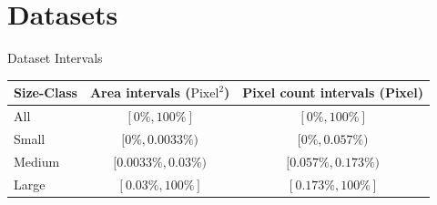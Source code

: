 \documentclass[18pt]{beamer}
\begin{document}
\section{Datasets}
\begin{frame}{Dataset Intervals}

    \begin{table}[H]
        \centering
        \begin{tabular}{l c c}
            \hline
            Size-Class      & Area intervals ($\text{Pixel}^2$)     & Pixel count intervals (Pixel)     \\
            \hline
            All & $[0\%, 100\%]$ & $[0\%, 100\%]$ \\
            Small & $[0\%, 0.0033\%)$ & $[0\%, 0.057\%)$ \\
            Medium & $[0.0033\%, 0.03\%)$ & $[0.057\%, 0.173\%)$ \\
            Large & $[0.03\%, 100\%]$ & $[0.173\%, 100\%]$ \\
            \hline
        \end{tabular}
    \end{table}
\end{frame}
\end{document}
